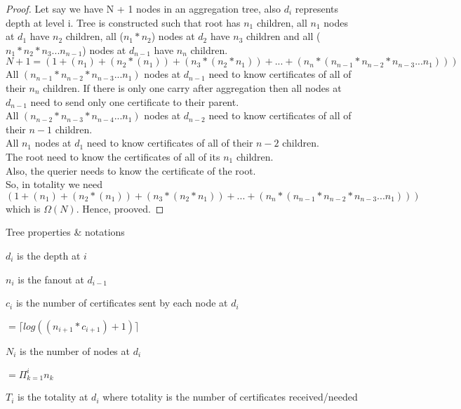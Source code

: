 \begin{proof}

	Let say we have N + 1 nodes in an aggregation tree, also $d_{i}$ represents depth at level i. Tree is constructed such that root has $n_{1}$ children, all $n_{1}$ nodes at $d_{1}$ have $n_{2}$ children, all ($n_{1} * n_{2}$)  nodes at $d_{2}$ have $n_{3}$ children and all ($n_{1} * n_{2} * n_{3} ... n_{n-1}$) nodes at $d_{n-1}$ have $n_{n}$ children.\\
	$ N + 1 = (1 + (n_{1}) + (n_{2} * (n_{1})) + (n_{3} * (n_{2} * n_{1})) + ... + (n_{n} * (n_{n-1} * n_{n-2} * n_{n-3} ... n_{1}) ) ) $\\
	
	All $ (n_{n-1} * n_{n-2} * n_{n-3} ... n_{1}) $ nodes at $ d_{n-1} $ need to know certificates of all of their $n_{n}$ children.
	If there is only one carry after aggregation then all nodes at $d_{n-1}$ need to send only one certificate to their parent.\\
	All $ (n_{n-2} * n_{n-3} * n_{n-4} ... n_{1}) $ nodes at $ d_{n-2} $ need to know certificates of all of their $ n-1 $ children.\\
	All $ n_{1} $ nodes at $ d_{1} $ need to know certificates of all of their $ n-2 $ children.\\
	The root need to know the certificates of all of its $ n_{1} $ children.\\
	Also, the querier needs to know the certificate of the root.\\
	So, in totality we need $ (1 + (n_{1}) + (n_{2} * (n_{1})) + (n_{3} * (n_{2} * n_{1})) + ... + (n_{n} * (n_{n-1} * n_{n-2} * n_{n-3} ... n_{1}) ) ) $ which is $\Omega(N)$. Hence, prooved.

\end{proof}

Tree properties \& notations

$d_{i}$ is the depth at $i$

$n_{i}$ is the fanout at $d_{i-1}$

$c_{i}$ is the number of certificates sent by each node at $d_{i}$
 												
 												$= \lceil log((n_{i+1} * c_{i+1}) + 1) \rceil$

$N_{i}$ is the number of nodes at $d_{i}$  

												$= \Pi_{k=1}^i n_k$

$T_{i}$ is the totality at $d_{i}$ where totality is the number of certificates received/needed
											
